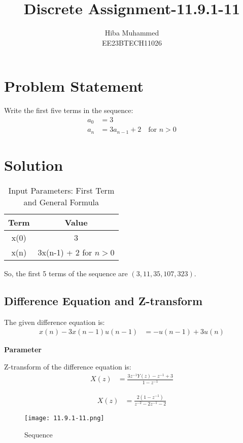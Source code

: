 \documentclass[12pt]{article}
\title{Discrete Assignment-11.9.1-11}
\author{Hiba Muhammed \\
        EE23BTECH11026}
\date{}
\newcommand{\brak}[1]{\left( #1 \right)}
\begin{document}
\maketitle

\section*{Problem Statement}
Write the first five terms in the sequence:
\begin{align}
a_{0}  &= 3 \\
a_{n}  &= 3a_{n-1} + 2 \quad \text{for } n > 0
\end{align}

\section*{Solution}

\begin{table}[h]
  \centering
  \caption{Input Parameters: First Term and General Formula}
  \begin{tabular}{|c|c|}
    \hline
    \textbf{Term} & \textbf{Value} \\
    \hline
    x(0) & 3 \\
    x(n) & 3x(n-1) + 2 for $n > 0$ \\
    \hline
  \end{tabular}
\end{table}

So, the first 5 terms of the sequence are $\brak{3, 11, 35, 107, 323}$.


\subsection*{Difference Equation and Z-transform}

The given difference equation is:
\begin{align}
x(n) - 3x(n-1)u(n-1) &=- u(n-1) + 3u(n)
\end{align}

\textbf{Parameter}

Z-transform of the difference equation is:
\begin{align}
X(z) &= \frac{3z^{-1}Y(z) - z^{-1} + 3}{1 - z^{-1}}
\end{align}

\begin{align}
X(z) &= \frac{2(1 - z^{-1})}{z^{-2} - 2z^{-1} - 2}
\end{align}

\begin{figure}[h]
    \centering
    \texttt{[image: 11.9.1-11.png]}
    \caption{Sequence}
\end{figure}
\end{document}
